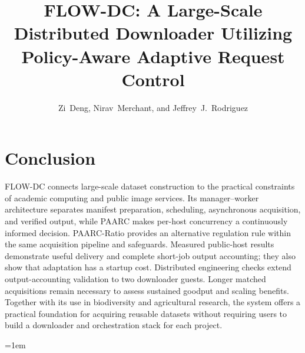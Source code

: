 \documentclass[10pt,journal,compsoc]{IEEEtran}
\title{FLOW-DC: A Large-Scale Distributed Downloader Utilizing Policy-Aware Adaptive Request Control}
\author{Zi~Deng, Nirav~Merchant, and Jeffrey~J.~Rodriguez%
\IEEEcompsocitemizethanks{\IEEEcompsocthanksitem The authors are with the University of Arizona, Tucson, AZ, USA.}}
\newcommand{\paarc}{PAARC}
\begin{document}
\maketitle
\IEEEdisplaynontitleabstractindextext
{}





\section{Conclusion}
FLOW-DC connects large-scale dataset construction to the practical constraints of academic computing and public image services. Its manager--worker architecture separates manifest preparation, scheduling, asynchronous acquisition, and verified output, while \paarc{} makes per-host concurrency a continuously informed decision. PAARC-Ratio provides an alternative regulation rule within the same acquisition pipeline and safeguards. Measured public-host results demonstrate useful delivery and complete short-job output accounting; they also show that adaptation has a startup cost. Distributed engineering checks extend output-accounting validation to two downloader guests. Longer matched acquisitions remain necessary to assess sustained goodput and scaling benefits. Together with its use in biodiversity and agricultural research, the system offers a practical foundation for acquiring reusable datasets without requiring users to build a downloader and orchestration stack for each project.

\begingroup
\emergencystretch=1em


\endgroup
\end{document}
